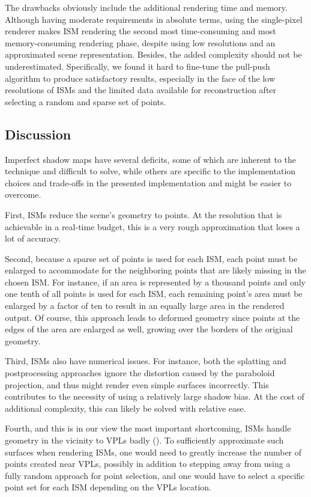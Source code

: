 The drawbacks obviously include the additional rendering time and memory. Although having moderate requirements in absolute terms, using the single-pixel renderer makes ISM rendering the second most time-consuming and most memory-consuming rendering phase, despite using low resolutions and an approximated scene representation. Besides, the added complexity should not be underestimated. Specifically, we found it hard to fine-tune the pull-push algorithm to produce satisfactory results, especially in the face of the low resolutions of ISMs and the limited data available for reconstruction after selecting a random and sparse set of points.


\pagebreak

\subsection{Discussion}
\label{sec:results:ism:discussion}

Imperfect shadow maps have several deficits, some of which are inherent to the technique and difficult to solve, while others are specific to the implementation choices and trade-offs in the presented implementation and might be easier to overcome.

First, ISMs reduce the scene's geometry to points. At the resolution that is achievable in a real-time budget, this is a very rough approximation that loses a lot of accuracy.

Second, because a sparse set of points is used for each ISM, each point must be enlarged to accommodate for the neighboring points that are likely missing in the chosen ISM. For instance, if an area is represented by a thousand points and only one tenth of all points is used for each ISM, each remaining point's area must be enlarged by a factor of ten to result in an equally large area in the rendered output. Of course, this approach leads to deformed geometry since points at the edges of the area are enlarged as well, growing over the borders of the original geometry.

Third, ISMs also have numerical issues. For instance, both the splatting and postprocessing approaches ignore the distortion caused by the paraboloid projection, and thus might render even simple surfaces incorrectly. This contributes to the necessity of using a relatively large shadow bias. At the cost of additional complexity, this can likely be solved with relative ease.

Fourth, and this is in our view the most important shortcoming, ISMs handle geometry in the vicinity to VPLs badly (). To sufficiently approximate such surfaces when rendering ISMs, one would need to greatly increase the number of points created near VPLs, possibly in addition to stepping away from using a fully random approach for point selection, and one would have to select a specific point set for each ISM depending on the VPLs location.


